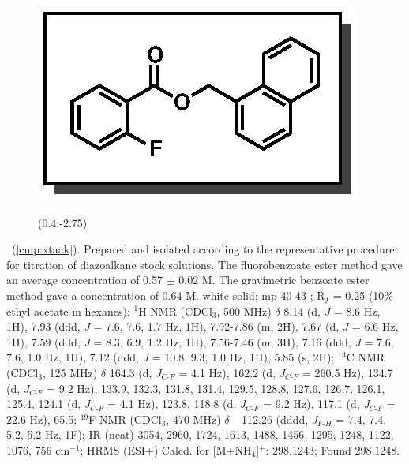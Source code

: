 \pagebreak
\begin{figure}
  \vspace{-20pt}
  \begin{center}
    \includegraphics[scale=0.8]{chp_asymmetric/images/xtaak}
          \begin{textblock}{1}(0.4,-2.75)  \end{textblock}
  \end{center}
  \vspace{-35pt}
\end{figure}\noindent \textbf{\CMPxtaak}\ (\ref{cmp:xtaak}). Prepared and
isolated according to the representative procedure for titration of diazoalkane
stock solutions. The fluorobenzoate ester method gave an average concentration
of 0.57 $\pm$ 0.02 M. The gravimetric benzoate ester method gave a concentration
of 0.64 M. white solid; mp 40-43 \degc; R$_f$ = 0.25 (10\% ethyl acetate in
hexanes); $^1$H NMR (CDCl$_3$, 500 MHz) $\delta$ 8.14 (d, \textit{J} = 8.6 Hz,
1H), 7.93 (ddd, \textit{J} = 7.6, 7.6, 1.7 Hz, 1H), 7.92-7.86 (m, 2H), 7.67 (d,
\textit{J} = 6.6 Hz, 1H), 7.59 (ddd, \textit{J} = 8.3, 6.9, 1.2 Hz, 1H),
7.56-7.46 (m, 3H), 7.16 (ddd, \textit{J} = 7.6, 7.6, 1.0 Hz, 1H), 7.12 (ddd,
\textit{J} = 10.8, 9.3, 1.0 Hz, 1H), 5.85 (s, 2H); $^{13}$C NMR (CDCl$_3$, 125
MHz) $\delta$ 164.3 (d, \textit{J}$_{C\mbox{-}F}$ = 4.1 Hz), 162.2 (d,
\textit{J}$_{C\mbox{-}F}$ = 260.5 Hz), 134.7 (d, \textit{J}$_{C\mbox{-}F}$ = 9.2
Hz), 133.9, 132.3, 131.8, 131.4, 129.5, 128.8, 127.6, 126.7, 126.1, 125.4, 124.1
(d, \textit{J}$_{C\mbox{-}F}$ = 4.1 Hz), 123.8, 118.8 (d,
\textit{J}$_{C\mbox{-}F}$ = 9.2 Hz), 117.1 (d, \textit{J}$_{C\mbox{-}F}$ = 22.6
Hz), 65.5; $^{19}$F NMR (CDCl$_3$, 470 MHz) $\delta$ $-$112.26 (dddd,
\textit{J}$_{F\mbox{-}H}$ = 7.4, 7.4, 5.2, 5.2 Hz, 1F); IR (neat) 3054, 2960,
1724, 1613, 1488, 1456, 1295, 1248, 1122, 1076, 756 cm$^{-1}$; HRMS (ESI+)
Calcd. for  [M+NH$_4$]$^+$: 298.1243; Found 298.1248.

